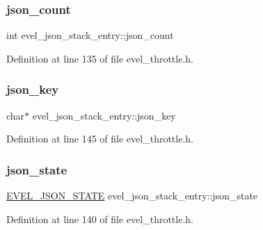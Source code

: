 \subsubsection{\texorpdfstring{json\+\_\+count}{json\_count}}
{\footnotesize\ttfamily int evel\+\_\+json\+\_\+stack\+\_\+entry\+::json\+\_\+count}



Definition at line 135 of file evel\+\_\+throttle.\+h.

\hypertarget{structevel__json__stack__entry_a838ed139e83ef12665ed91cad1e2bd4c}{}\label{structevel__json__stack__entry_a838ed139e83ef12665ed91cad1e2bd4c} 
\subsubsection{\texorpdfstring{json\+\_\+key}{json\_key}}
{\footnotesize\ttfamily char$\ast$ evel\+\_\+json\+\_\+stack\+\_\+entry\+::json\+\_\+key}



Definition at line 145 of file evel\+\_\+throttle.\+h.

\hypertarget{structevel__json__stack__entry_a7b10fc3a2f252b1dcc105ab607b93a54}{}\label{structevel__json__stack__entry_a7b10fc3a2f252b1dcc105ab607b93a54} 
\subsubsection{\texorpdfstring{json\+\_\+state}{json\_state}}
{\footnotesize\ttfamily \hyperlink{evel__throttle_8h_af2ee805305a97e62d3b9d3e526513b6a}{E\+V\+E\+L\+\_\+\+J\+S\+O\+N\+\_\+\+S\+T\+A\+TE} evel\+\_\+json\+\_\+stack\+\_\+entry\+::json\+\_\+state}



Definition at line 140 of file evel\+\_\+throttle.\+h.

\hypertarget{structevel__json__stack__entry_a46862bf5ad0d1cd020923b574a2f207b}{}\label{structevel__json__stack__entry_a46862bf5ad0d1cd020923b574a2f207b} 

